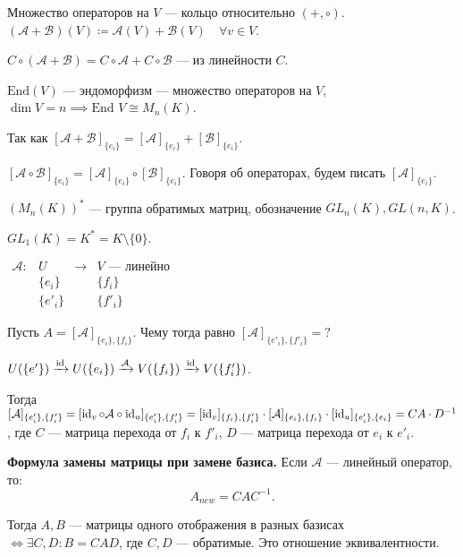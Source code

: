 Множество операторов на $V$ --- кольцо относительно  $(+, \circ)$.  $(\mathcal{A} + \mathcal{B})(V) \coloneqq \mathcal{A}(V) + \mathcal{B}(V) \quad \forall v \in V$.

$C \circ (\mathcal{A} + \mathcal{B}) = C \circ \mathcal{A} + C \circ \mathcal{B}$ --- из линейности $C$.

 \begin{definition}
     $\text{End}(V)$ --- эндоморфизм --- множество операторов на $V$,  $\dim V = n \implies \text{End } V \cong M_n(K)$.
\end{definition}

Так как $[\mathcal{A} + \mathcal{B}]_{\{e_i\}} = [\mathcal{A}]_{\{e_i\}} + [\mathcal{B}]_{\{e_i\}}$.

$[\mathcal{A} \circ \mathcal{B}]_{\{e_i\}} = [\mathcal{A}]_{\{e_i\}} \circ [\mathcal{B}]_{\{e_i\}}$. Говоря об операторах, будем писать  $[\mathcal{A}]_{\{e_i\}}$.

$\left(M_n(K)\right)^*$ --- группа обратимых матриц, обозначение  $GL_n(K), GL(n, K)$.

\begin{example}
    $GL_1(K) = K^* = K \setminus \{0\}$.
\end{example}

$\begin{array}{llll} \mathcal{A}\!: & U & \to & V\text{ --- линейно} \\ & \{e_i\} && \{f_i\} \\ & \{e'_i\} && \{f'_i\} \end{array}$

Пусть  $A = [\mathcal{A}]_{\{e_i\}, \{f_i\}}$. Чему тогда равно  $[\mathcal{A}]_{\{e'_i\}, \{f'_i\}} = ?$

$U (\{e'\}) \xrightarrow{\operatorname{id}} U(\{e_i\}) \xrightarrow{\mathcal{A}} V (\{f_i\}) \xrightarrow{\operatorname{id}} V(\{f'_i\})$.

Тогда  $[\mathcal{A}]_{\{e'_i\}, \{f'_i\}} = [\operatorname{id}_v \circ \mathcal{A} \circ \operatorname{id}_u]_{\{e'_i\}, \{f'_i\}} = [\operatorname{id}_v]_{\{f_i\}, \{f'_i\}} \cdot [\mathcal{A}]_{\{e_i\}, \{f_i\}} \cdot [\operatorname{id}_u]_{\{e'_i\}, \{e_i\}} = C A \cdot D^{-1}$, где  $C$ --- матрица перехода от  $f_i$ к  $f'_i$,  $D$ --- матрица перехода  от $e_i$ к  $e'_i$.

\textbf{Формула замены матрицы при замене базиса.} Если $\mathcal{A}$ --- линейный оператор, то:   \[
    A_{new} = C A C^{-1}
.\]

Тогда $A, B$ --- матрицы одного отображения в разных базисах $\iff \exists C, D: B=CAD$, где $C, D$ --- обратимые. Это отношение эквивалентности.

